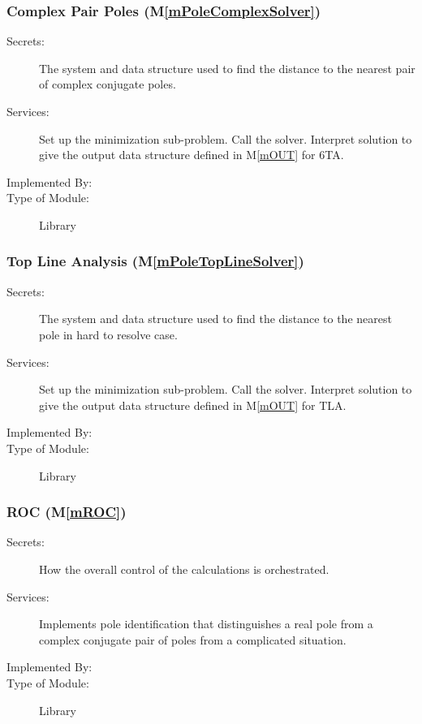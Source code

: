 \documentclass[12pt, titlepage]{article}
\newcommand{\mref}[1]{M\ref{#1}}
\begin{document}
\subsubsection{Complex Pair Poles (\mref{mPoleComplexSolver})}

\begin{description}
\item[Secrets:] The system and data structure used to find the distance to the nearest
  pair of complex conjugate poles.
\item[Services:] Set up the minimization sub-problem. Call the solver. Interpret
  solution to give the output data structure defined in \mref{mOUT} for 6TA.
\item[Implemented By:] 
\item[Type of Module:] Library
\end{description}

\subsubsection{Top Line Analysis (\mref{mPoleTopLineSolver})}

\begin{description}
\item[Secrets:] The system and data structure used to find the distance to the nearest
  pole in hard to resolve case.
\item[Services:] Set up the minimization sub-problem. Call the solver. Interpret
  solution to give the output data structure defined in \mref{mOUT} for TLA.
\item[Implemented By:] 
\item[Type of Module:] Library
\end{description}

\subsubsection{ROC (\mref{mROC})}

\begin{description}
\item[Secrets:] How the overall control of the calculations is orchestrated.
\item[Services:] Implements pole identification that distinguishes a real pole from
  a complex conjugate pair of poles from a complicated situation.
\item[Implemented By:] 
\item[Type of Module:] Library
\end{description}
\end{document}
